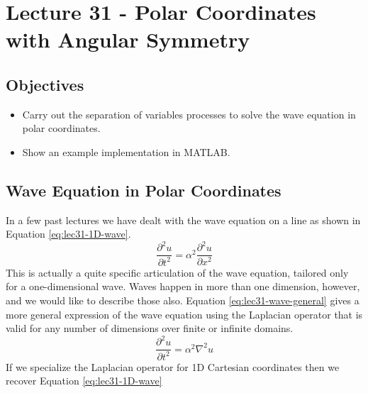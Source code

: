 \chapter{Lecture 31 - Polar Coordinates with Angular Symmetry}
\label{ch:lec31}
\section{Objectives}
\begin{itemize}
\item Carry out the separation of variables processes to solve the wave equation in polar coordinates.
\item Show an example implementation in MATLAB.
\end{itemize}
\setcounter{lstannotation}{0}

\section{Wave Equation in Polar Coordinates}
In a few past lectures we have dealt with the wave equation on a line as shown in Equation \ref{eq:lec31-1D-wave}.
\begin{equation}
\frac{\partial^2 u}{\partial t^2} = \alpha^2 \frac{\partial^2 u}{\partial x^2}
\label{eq:lec31-1D-wave}
\end{equation}
This is actually a quite specific articulation of the wave equation, tailored only for a one-dimensional wave.  Waves happen in more than one dimension, however, and we would like to describe those also.  Equation \ref{eq:lec31-wave-general} gives a more general expression of the wave equation using the Laplacian operator that is valid for any number of dimensions over finite or infinite domains.
\begin{equation}
\frac{\partial^2 u}{\partial t^2} = \alpha^2 \nabla^2 u
\label{eq:lec31-wave-general}
\end{equation}
If we specialize the Laplacian operator for 1D Cartesian coordinates then we recover Equation \ref{eq:lec31-1D-wave}


